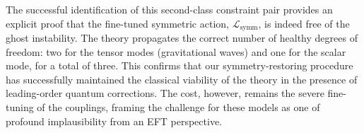 \documentclass[twocolumn]{aastex631}
\begin{document}
The successful identification of this second-class constraint pair provides an explicit proof that the fine-tuned symmetric action, $\mathcal{L}_{\text{symm}}$, is indeed free of the ghost instability. The theory propagates the correct number of healthy degrees of freedom: two for the tensor modes (gravitational waves) and one for the scalar mode, for a total of three. This confirms that our symmetry-restoring procedure has successfully maintained the classical viability of the theory in the presence of leading-order quantum corrections. The cost, however, remains the severe fine-tuning of the couplings, framing the challenge for these models as one of profound implausibility from an EFT perspective.
\end{document}
